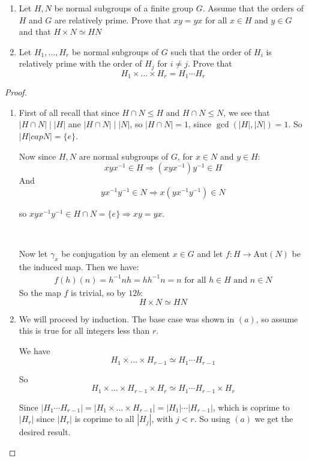 \begin{exercise}
    \begin{enumerate}[label = (\alph*)]
        \item Let $H,N$ be normal subgroups of a finite group $G$. Assume that the orders of $H$ and $G$ are relatively prime. Prove that $xy=yx$ for all $x\in H$ and $y\in G$ and that $H\times N\simeq HN$
        \item Let $H_1,\ldots,H_r$ be normal subgroups of $G$ such that the order of $H_i$ is relatively prime with the order of $H_j$ for $i\neq j$. Prove that \[H_1\times \ldots \times H_r = H_1\cdots H_r\]
    \end{enumerate}
    \begin{proof}
        \begin{enumerate}[label = (\alph*)]
            \item First of all recall that since $H\cap N\leq H$ and $H\cap N\leq N$, we see that $|H\cap N| \mid |H|$ ane $|H\cap N|\mid |N|$, so $|H\cap N| = 1$, since $\gcd(|H|,|N|) = 1$. So $|H|cap N| = \{e\}$.
            
            Now since $H,N$ are normal subgroups of $G$, for $x\in N$ and $y\in H$:\begin{equation*}
                xyx^{-1}\in H \Rightarrow (xyx^{-1})y^{-1}\in H
            \end{equation*}
            And \begin{equation*}
                yx^{-1}y^{-1}\in N \Rightarrow x(yx^{-1}y^{-1})\in N
            \end{equation*}

            so $xyx^{-1}y^{-1}\in H\cap N = \{e\} \Rightarrow xy = yx$.

            \

            Now let $\gamma_x$ be conjugation by an element $x\in G$ and let $f\colon H\rightarrow \text{Aut}(N)$ be the induced map. Then we have:\begin{align*}
                f(h)(n) = h^{-1}nh = hh^{-1}n = n \text{ for all }h\in H \text{ and }n\in N
            \end{align*}
            So the map $f$ is trivial, so by $12b$:\[H\times N \simeq HN\]
            \item  We will proceed by induction. The base case was shown in $(a)$, so assume this is true for all integers less than $r$.
            
            We have \[H_1\times \ldots \times H_{r-1}\simeq H_1\cdots H_{r-1}\]

            So \[H_1\times \ldots \times H_{r-1}\times H_r \simeq H_1\cdots H_{r-1}\times H_r \]

            Since $|H_1\cdots H_{r-1}| = |H_1\times \ldots \times H_{r-1}| = |H_1| \cdots |H_{r-1}|$, which is coprime to $|H_r|$ since $|H_r|$ is coprime to all $|H_j|$, with $j<r$. So using $(a)$ we get the desired result.
        \end{enumerate}
    \end{proof}
\end{exercise}
